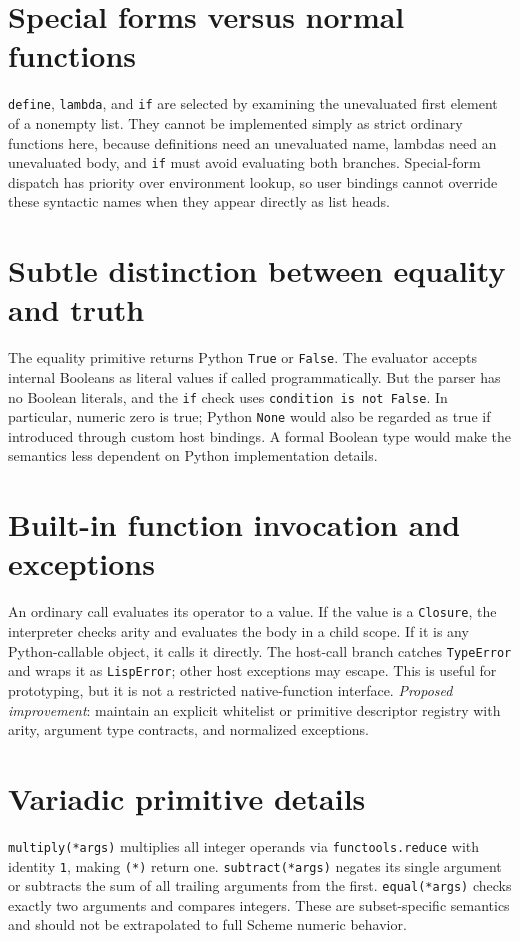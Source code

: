 \documentclass[11pt,a4paper,oneside]{report}
\begin{document}
\section{Special forms versus normal functions}
\texttt{define}, \texttt{lambda}, and \texttt{if} are selected by examining the unevaluated first element of a nonempty list. They cannot be implemented simply as strict ordinary functions here, because definitions need an unevaluated name, lambdas need an unevaluated body, and \texttt{if} must avoid evaluating both branches. Special-form dispatch has priority over environment lookup, so user bindings cannot override these syntactic names when they appear directly as list heads.
\section{Subtle distinction between equality and truth}
The equality primitive returns Python \texttt{True} or \texttt{False}. The evaluator accepts internal Booleans as literal values if called programmatically. But the parser has no Boolean literals, and the \texttt{if} check uses \texttt{condition is not False}. In particular, numeric zero is true; Python \texttt{None} would also be regarded as true if introduced through custom host bindings. A formal Boolean type would make the semantics less dependent on Python implementation details.
\section{Built-in function invocation and exceptions}
An ordinary call evaluates its operator to a value. If the value is a \texttt{Closure}, the interpreter checks arity and evaluates the body in a child scope. If it is any Python-callable object, it calls it directly. The host-call branch catches \texttt{TypeError} and wraps it as \texttt{LispError}; other host exceptions may escape. This is useful for prototyping, but it is not a restricted native-function interface. \emph{Proposed improvement}: maintain an explicit whitelist or primitive descriptor registry with arity, argument type contracts, and normalized exceptions.
\section{Variadic primitive details}
\texttt{multiply(*args)} multiplies all integer operands via \texttt{functools.reduce} with identity \texttt{1}, making \texttt{(*)} return one. \texttt{subtract(*args)} negates its single argument or subtracts the sum of all trailing arguments from the first. \texttt{equal(*args)} checks exactly two arguments and compares integers. These are subset-specific semantics and should not be extrapolated to full Scheme numeric behavior.
\end{document}
